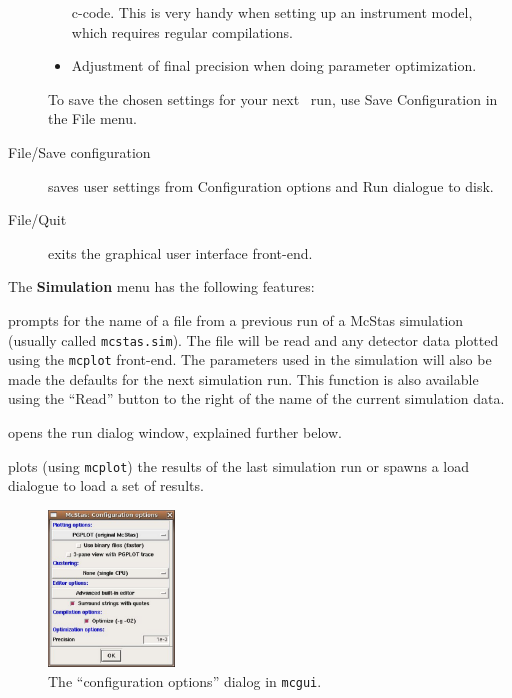 \begin{description}
\begin{itemize}
    c-code. This is very handy when setting up an instrument model, which
    requires regular compilations.
  \item Adjustment of final precision when doing parameter optimization.
\end{itemize}
To save the chosen settings for your next \MCS\ run, use Save
Configuration in the File menu.
\item[File/Save configuration] saves user settings from Configuration
  options and Run dialogue to disk.
\item[File/Quit] exits the graphical user interface front-end.
\end{description}

\noindent The {\bf Simulation} menu has the following features:
\begin{description} 
\item[Simulation/Read old simulation] prompts for the name of a file
  from a previous run of a McStas simulation (usually called
  \verb+mcstas.sim+). The file will be read and any detector data
  plotted using the \verb+mcplot+ front-end. The parameters used in the
  simulation will also be made the defaults for the next simulation
  run. This function is also available using the ``Read'' button to the
  right of the name of the current simulation data.
\item[Simulation/Run simulation] opens the run dialog window, explained
  further below.
\item[Simulation/Plot results] plots (using \verb+mcplot+) the results of the
  last simulation run or spawns a load dialogue to load a set of results.
\end{description}


\begin{figure}[htb!]
  \begin{center}
    \includegraphics[width=0.3\textwidth]{figures/choose_backend.eps}
  \end{center}
\caption{The ``configuration options'' dialog in \texttt{mcgui}.}
\label{fig:mcgui-choose}
\end{figure}


